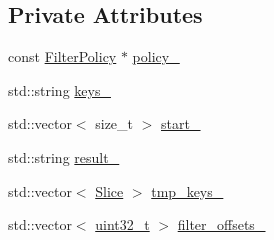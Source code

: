 \subsection*{Private Attributes}
\begin{DoxyCompactItemize}
\item 
const \hyperlink{classleveldb_1_1_filter_policy}{Filter\-Policy} $\ast$ \hyperlink{classleveldb_1_1_filter_block_builder_ae1fcb392ca7421a33699f516e3c724e0}{policy\-\_\-}
\item 
std\-::string \hyperlink{classleveldb_1_1_filter_block_builder_a948705862c1b6c371e6044f588de489a}{keys\-\_\-}
\item 
std\-::vector$<$ size\-\_\-t $>$ \hyperlink{classleveldb_1_1_filter_block_builder_a17f19fc8365e35a5808c97482f2fea3a}{start\-\_\-}
\item 
std\-::string \hyperlink{classleveldb_1_1_filter_block_builder_ad8230068e41814f72ad4097803dfe382}{result\-\_\-}
\item 
std\-::vector$<$ \hyperlink{classleveldb_1_1_slice}{Slice} $>$ \hyperlink{classleveldb_1_1_filter_block_builder_a3f111a41d738802bdd2a6c50892718f5}{tmp\-\_\-keys\-\_\-}
\item 
std\-::vector$<$ \hyperlink{stdint_8h_a435d1572bf3f880d55459d9805097f62}{uint32\-\_\-t} $>$ \hyperlink{classleveldb_1_1_filter_block_builder_ac53c5d18c650072ad09596bf8c3f0e7a}{filter\-\_\-offsets\-\_\-}
\end{DoxyCompactItemize}


